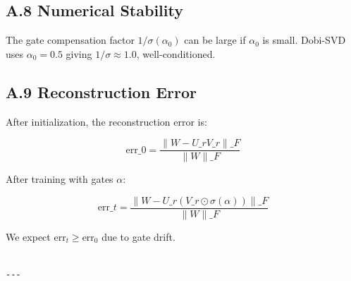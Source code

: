 \subsection{A.8 Numerical Stability}

The gate compensation factor $1/\sigma(\alpha_0)$ can be large if 
$\alpha_0$ is small. Dobi-SVD uses $\alpha_0 = 0.5$ giving 
$1/\sigma \approx 1.0$, well-conditioned.

\subsection{A.9 Reconstruction Error}

After initialization, the reconstruction error is:

\[
\text{err}\_0 = \frac{\|W - U\_r V\_r\|\_F}{\|W\|\_F}
\tag{A.8}
\]

After training with gates $\alpha$:

\[
\text{err}\_t = \frac{\|W - U\_r (V\_r \odot \sigma(\alpha))\|\_F}{\|W\|\_F}
\tag{A.9}
\]

We expect $\text{err}_t \geq \text{err}_0$ due to gate drift.
\begin{lstlisting}

---
\end{lstlisting}